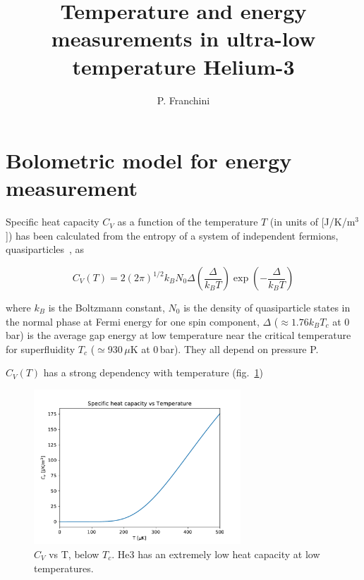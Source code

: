 \documentclass[a4paper,12pt]{article}
\title{Temperature and energy measurements in ultra-low temperature Helium-3}
\author{P. Franchini}
\begin{document}
\maketitle


\section{Bolometric model for energy measurement}

Specific heat capacity $C_V$ as a function of the temperature $T$ (in units of [J/K/m$^3$]) has been calculated from the entropy of a system of independent fermions, quasiparticles~\cite{vollhardt}, as

\begin{equation}
C_V(T)=2(2\pi)^{1/2}k_BN_0\varDelta\left(\frac{\varDelta}{k_BT}\right)\exp\left(-\frac{\varDelta}{k_BT}\right)
\end{equation}

where $k_B$ is the Boltzmann constant, $N_0$ is the density of quasiparticle states in the normal phase at Fermi energy for one spin component, $\varDelta$ ($\approx 1.76 k_B T_c$ at 0\,bar) is the average gap energy at low temperature near the critical temperature for superfluidity $T_c$ ($\simeq$930\,$\mu$K at 0\,bar). They all depend on pressure P.

$C_V(T)$ has a strong dependency with temperature (fig.~\ref{fig:CvT})

\begin{figure}[htb]
  \begin{center}
    \includegraphics[width=0.69\textwidth]{Cv_vs_T-zoom}
  \end{center}
  \caption{$C_V$ vs T, below $T_c$. He3 has an extremely low heat capacity at low temperatures.}
  \label{fig:CvT}
\end{figure}
\end{document}
